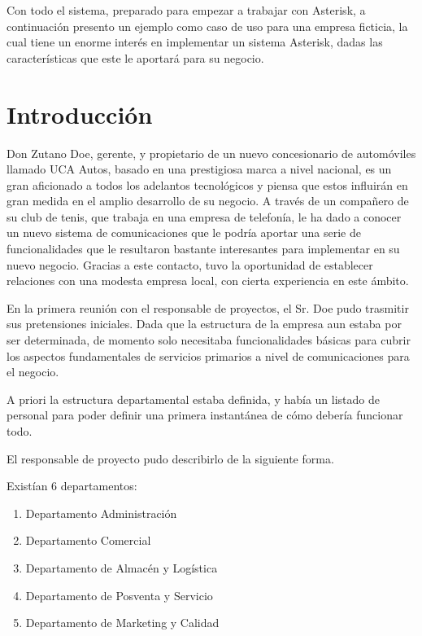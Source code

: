 
Con todo el sistema, preparado para empezar a trabajar con Asterisk, a continuación presento un ejemplo como caso de uso para una empresa ficticia, la cual tiene un enorme interés en implementar un sistema Asterisk, dadas las características que este le aportará para su negocio.

\color[rgb]{0,0,1}

\section{Introducción}

Don Zutano Doe, gerente, y propietario de un nuevo concesionario de automóviles llamado UCA Autos, basado en una prestigiosa marca a nivel nacional, es un gran aficionado a todos los adelantos tecnológicos y piensa que estos influirán en gran medida en el amplio desarrollo de su negocio. A través de un compañero de su club de tenis, que trabaja en una empresa de telefonía, le ha dado a conocer un nuevo sistema de comunicaciones que le podría aportar una serie de funcionalidades que le resultaron bastante interesantes para implementar en su nuevo negocio. Gracias a este contacto, tuvo la oportunidad de establecer relaciones con una modesta empresa local, con cierta experiencia en este ámbito.

En la primera reunión con el responsable de proyectos, el Sr. Doe pudo trasmitir sus pretensiones iniciales. Dada que la estructura de la empresa aun estaba por ser determinada, de momento solo necesitaba funcionalidades básicas para cubrir los aspectos fundamentales de servicios primarios a nivel de comunicaciones para el negocio.

A priori la estructura departamental estaba definida, y había un listado de personal para poder definir una primera instantánea de cómo debería funcionar todo.

El responsable de proyecto pudo describirlo de la siguiente forma.

Existían 6 departamentos:

\begin{enumerate}

\item Departamento Administración
\item Departamento Comercial
\item Departamento de Almacén y Logística
\item Departamento de Posventa y Servicio
\item Departamento de Marketing y Calidad

\end{enumerate}


